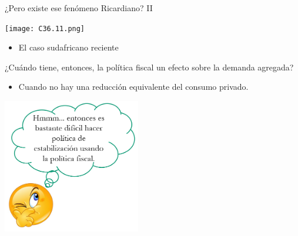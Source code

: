 \documentclass{beamer}
\begin{document}

\begin{frame}{¿Pero existe ese fenómeno Ricardiano? II}

    

     \centering\texttt{[image: C36.11.png]}\  
\begin{itemize}
    \item El caso sudafricano reciente
    \end{itemize}

\end{frame}



\begin{frame}{¿Cuándo tiene, entonces, la política fiscal un efecto sobre la demanda agregada?}

    \begin{itemize}
    \item Cuando no hay una reducción equivalente del consumo privado.
    \end{itemize}
     \vspace{3mm}
    
    \centering\includegraphics[width=6cm]{P95b.png}\

\end{frame}

\end{document}

